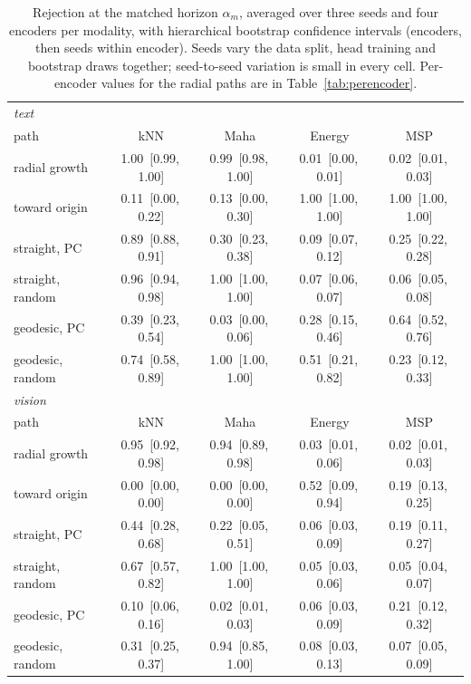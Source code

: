 \documentclass[twoside]{article}
\theoremstyle{definition}
\theoremstyle{remark}
\begin{document}
\begin{table}[!htbp]
\centering
\small
\caption{Rejection at the matched horizon $\alpha_m$, averaged over three seeds and four encoders per modality,
with hierarchical bootstrap confidence intervals (encoders, then seeds within encoder). Seeds vary the data
split, head training and bootstrap draws together; seed-to-seed variation is small in every cell.
Per-encoder values for the radial paths are in Table~\ref{tab:perencoder}.}
\label{tab:matched}
\begin{tabular}{lcccc}
\toprule
\multicolumn{5}{l}{\emph{text}}\\
path & kNN & Maha & Energy & MSP \\
\midrule
radial growth & 1.00 \,[0.99,\,1.00] & 0.99 \,[0.98,\,1.00] & 0.01 \,[0.00,\,0.01] & 0.02 \,[0.01,\,0.03] \\
toward origin & 0.11 \,[0.00,\,0.22] & 0.13 \,[0.00,\,0.30] & 1.00 \,[1.00,\,1.00] & 1.00 \,[1.00,\,1.00] \\
straight, PC & 0.89 \,[0.88,\,0.91] & 0.30 \,[0.23,\,0.38] & 0.09 \,[0.07,\,0.12] & 0.25 \,[0.22,\,0.28] \\
straight, random & 0.96 \,[0.94,\,0.98] & 1.00 \,[1.00,\,1.00] & 0.07 \,[0.06,\,0.07] & 0.06 \,[0.05,\,0.08] \\
geodesic, PC & 0.39 \,[0.23,\,0.54] & 0.03 \,[0.00,\,0.06] & 0.28 \,[0.15,\,0.46] & 0.64 \,[0.52,\,0.76] \\
geodesic, random & 0.74 \,[0.58,\,0.89] & 1.00 \,[1.00,\,1.00] & 0.51 \,[0.21,\,0.82] & 0.23 \,[0.12,\,0.33] \\
\midrule
\multicolumn{5}{l}{\emph{vision}}\\
path & kNN & Maha & Energy & MSP \\
\midrule
radial growth & 0.95 \,[0.92,\,0.98] & 0.94 \,[0.89,\,0.98] & 0.03 \,[0.01,\,0.06] & 0.02 \,[0.01,\,0.03] \\
toward origin & 0.00 \,[0.00,\,0.00] & 0.00 \,[0.00,\,0.00] & 0.52 \,[0.09,\,0.94] & 0.19 \,[0.13,\,0.25] \\
straight, PC & 0.44 \,[0.28,\,0.68] & 0.22 \,[0.05,\,0.51] & 0.06 \,[0.03,\,0.09] & 0.19 \,[0.11,\,0.27] \\
straight, random & 0.67 \,[0.57,\,0.82] & 1.00 \,[1.00,\,1.00] & 0.05 \,[0.03,\,0.06] & 0.05 \,[0.04,\,0.07] \\
geodesic, PC & 0.10 \,[0.06,\,0.16] & 0.02 \,[0.01,\,0.03] & 0.06 \,[0.03,\,0.09] & 0.21 \,[0.12,\,0.32] \\
geodesic, random & 0.31 \,[0.25,\,0.37] & 0.94 \,[0.85,\,1.00] & 0.08 \,[0.03,\,0.13] & 0.07 \,[0.05,\,0.09] \\
\bottomrule
\end{tabular}
\end{table}
\end{document}
